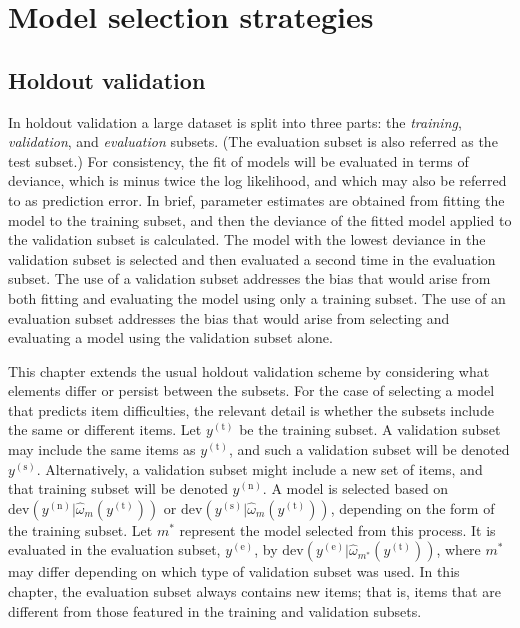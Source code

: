 \section{Model selection strategies}


\subsection{Holdout validation}

In holdout validation a large dataset is split into three parts: the \emph{training}, \emph{validation}, and \emph{evaluation} subsets. 
(The evaluation subset is also referred as the test subset.)
For consistency, the fit of models will be evaluated in terms of deviance, which is minus twice the log likelihood, and which may also be referred to as prediction error.
In brief, parameter estimates are obtained from fitting the model to the training subset, and then the deviance of the fitted model applied to the validation subset is calculated. 
The model with the lowest deviance in the validation subset is selected and then evaluated a second time in the evaluation subset.
The use of a validation subset addresses the bias that would arise from both fitting and evaluating the model using only a training subset.
The use of an evaluation subset addresses the bias that would arise from selecting and evaluating a model using the validation subset alone.

This chapter extends the usual holdout validation scheme by considering what elements differ or persist between the subsets. 
For the case of selecting a model that predicts item difficulties, the relevant detail is whether the subsets include the same or different items. 
Let $y^{(\mathrm{t})}$ be the training subset. 
A validation subset may include the same items as $y^{(\mathrm{t})}$, and such a validation subset will be denoted $y^{(\mathrm{s})}$. 
Alternatively, a validation subset might include a new set of items, and that training subset will be denoted $y^{(\mathrm{n})}$. 
A model is selected based on 
	$\mathrm{dev}(y^{(\mathrm{n})} | \hat \omega_m(y^{(\mathrm{t})}))$ or
	$\mathrm{dev}(y^{(\mathrm{s})} | \hat \omega_m(y^{(\mathrm{t})}))$, 
	depending on the form of the training subset.
Let $m^*$ represent the model selected from this process.
It is evaluated in the evaluation subset, $y^{(\mathrm{e})}$, by 
	$\mathrm{dev}(y^{(\mathrm{e})} | \hat \omega_{m^*}(y^{(\mathrm{t})}))$,
where $m^*$ may differ depending on which type of validation subset was used.
In this chapter, the evaluation subset always contains new items; that is, items that are different from those featured in the training and validation subsets.

